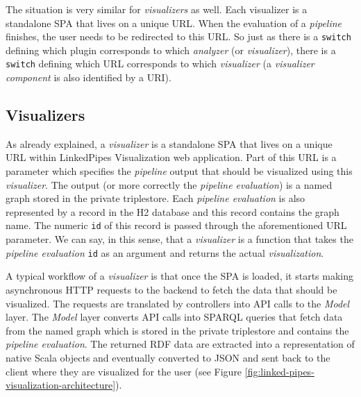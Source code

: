 The situation is very similar for \emph{visualizers} as well. Each visualizer is a standalone SPA that lives on a unique URL. When the evaluation of a \emph{pipeline} finishes, the user needs to be redirected to this URL. So just as there is a \texttt{switch} defining which plugin corresponds to which \emph{analyzer} (or \emph{visualizer}), there is a \texttt{switch} defining which URL corresponds to which \emph{visualizer} (a \emph{visualizer component} is also identified by a URI).

\subsection{Visualizers}
\label{sec:linkedpipes:visualizers}

As already explained, a \emph{visualizer} is a standalone SPA that lives on a unique URL within LinkedPipes Visualization web application. Part of this URL is a parameter which specifies the \emph{pipeline} output that should be visualized using this \emph{visualizer}. The output (or more correctly the \emph{pipeline evaluation}) is a named graph stored in the private triplestore. Each \emph{pipeline evaluation} is also represented by a record in the H2 database and this record contains the graph name. The numeric \texttt{id} of this record is passed through the aforementioned URL parameter. We can say, in this sense, that a \emph{visualizer} is a function that takes the \emph{pipeline evaluation} \texttt{id} as an argument and returns the actual \emph{visualization}.
%
%
%

A typical workflow of a \emph{visualizer} is that once the SPA is loaded, it starts making asynchronous HTTP requests to the backend to fetch the data that should be visualized. The requests are translated by controllers into API calls to the \emph{Model} layer.  The \emph{Model} layer converts API calls into SPARQL queries that fetch data from the named graph which is stored in the private triplestore and contains the \emph{pipeline evaluation}. The returned RDF data are extracted into a representation of native Scala objects and eventually converted to JSON and sent back to the client where they are visualized for the user (see Figure \ref{fig:linked-pipes-visualization-architecture}).

